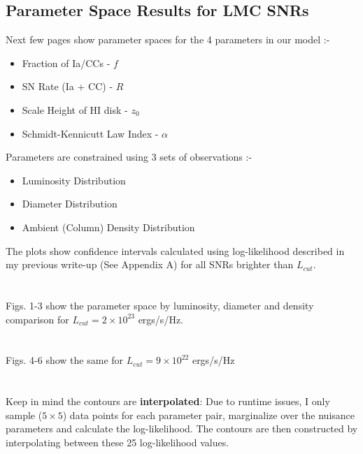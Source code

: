 \documentclass[10pt,a4paper]{article}
\begin{document}
\begin{center}
	\section* {Parameter Space Results for LMC SNRs}
\end{center}
Next few pages show parameter spaces for the 4 parameters in our model :-
\begin{itemize}
\item Fraction of Ia/CCs - $f$
\item SN Rate (Ia + CC) - $R$
\item Scale Height of HI disk - $z_0$
\item Schmidt-Kennicutt Law Index - $\alpha$\\
\end{itemize}
Parameters are constrained using 3 sets of observations :-
\begin{itemize}
\item Luminosity Distribution
\item Diameter Distribution
\item Ambient (Column) Density Distribution\\
\end{itemize}
The plots show confidence intervals calculated using log-likelihood described in my previous write-up (See Appendix A) for all SNRs brighter than $L_{cut}$.\\\\\\
Figs. 1-3 show the parameter space by luminosity, diameter and density comparison for $L_{cut} = 2 \times 10^{23}$ ergs/s/Hz.\\\\\\
Figs. 4-6 show the same for $L_{cut} = 9 \times 10^{22}$ ergs/s/Hz\\\\\\
Keep in mind the contours are \textbf{interpolated}: Due to runtime issues, I only sample ($5 \times 5$) data points for each parameter pair, marginalize over the nuisance parameters and calculate the log-likelihood. The contours are then constructed by interpolating between these 25 log-likelihood values.\\\\
\newpage
\end{document}
